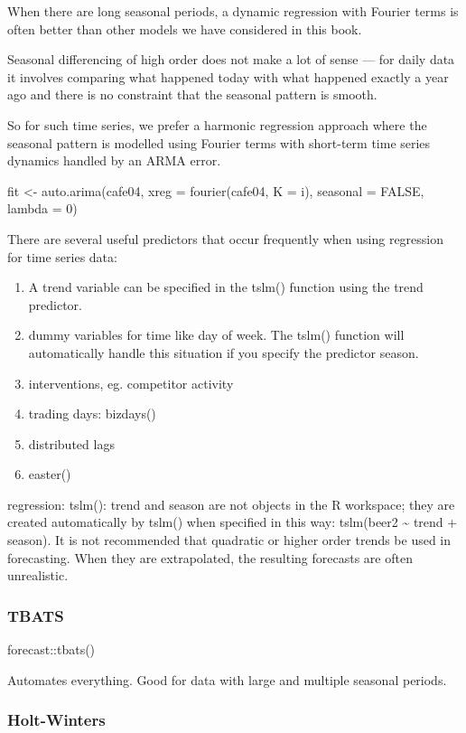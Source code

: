 \documentclass[]{book}
\begin{document}
When there are long seasonal periods, a dynamic regression with Fourier terms is often better than other models we have considered in this book.

Seasonal differencing of high order does not make a lot of sense --- for daily data it involves comparing what happened today with what happened exactly a year ago and there is no constraint that the seasonal pattern is smooth.

So for such time series, we prefer a harmonic regression approach where the seasonal pattern is modelled using Fourier terms with short-term time series dynamics handled by an ARMA error.

fit \textless{}- auto.arima(cafe04, xreg = fourier(cafe04, K = i), seasonal = FALSE, lambda = 0)

There are several useful predictors that occur frequently when using regression for time series data:

\begin{enumerate}
\def\labelenumi{\arabic{enumi})}
\item
  A trend variable can be specified in the tslm() function using the trend predictor.
\item
  dummy variables for time like day of week. The tslm() function will automatically handle this situation if you specify the predictor season.
\item
  interventions, eg. competitor activity
\item
  trading days: bizdays()
\item
  distributed lags
\item
  easter()
\end{enumerate}

regression: tslm(): trend and season are not objects in the R workspace; they are created automatically by tslm() when specified in this way: tslm(beer2 \textasciitilde{} trend + season). It is not recommended that quadratic or higher order trends be used in forecasting. When they are extrapolated, the resulting forecasts are often unrealistic.

\hypertarget{tbats}{%
\subsubsection{TBATS}\label{tbats}}

forecast::tbats()

Automates everything. Good for data with large and multiple seasonal periods.

\hypertarget{holt-winters}{%
\subsubsection{Holt-Winters}\label{holt-winters}}
\end{document}
